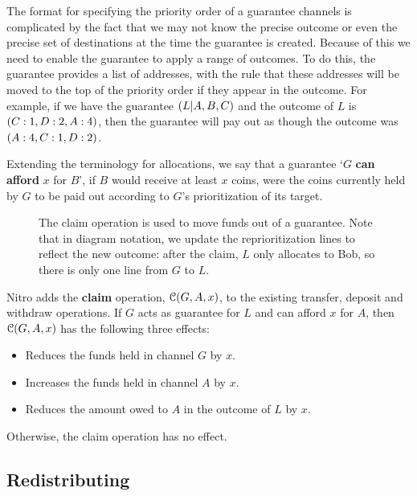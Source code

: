 The format for specifying the priority order of a guarantee channels is complicated by the fact that we may not know the precise outcome or even the precise set of destinations at the time the guarantee is created.
Because of this we need to enable the guarantee to apply a range of outcomes.
To do this, the guarantee provides a list of addresses, with the rule that these addresses will be moved to the top of the priority order if they appear in the outcome.
For example, if we have the guarantee $( L | A, B, C )$ and the outcome of $L$ is $( C: 1, D:2, A:4 )$, then the guarantee will pay out as though the outcome was $( A:4, C:1, D: 2 )$.

Extending the terminology for allocations, we say that a guarantee `$G$ \textbf{can afford} $x$ for $B$', if $B$ would receive at least $x$ coins, were the coins currently held by $G$ to be paid out according to $G$'s prioritization of its target.

\begin{figure}[ht]\centering
  \makebox[\textwidth][c]{}
  \caption{
    The claim operation is used to move funds out of a guarantee.
    Note that in diagram notation, we update the reprioritization lines to reflect the new outcome: after the claim, $L$ only allocates to Bob, so there is only one line from $G$ to $L$.
  }
  \label{fig:claim-operation}
\end{figure}

Nitro adds the \textbf{claim} operation, $\mathcal{C}(G, A, x)$, to the existing transfer, deposit and withdraw operations.
If $G$ acts as guarantee for $L$ and can afford $x$ for $A$, then $\mathcal{C}(G, A, x)$ has the following three effects:
\begin{itemize}
  \item Reduces the funds held in channel $G$ by $x$.
  \item Increases the funds held in channel $A$ by $x$.
  \item Reduces the amount owed to $A$ in the outcome of $L$ by $x$.
\end{itemize}
Otherwise, the claim operation has no effect.


\subsection{Redistributing}

